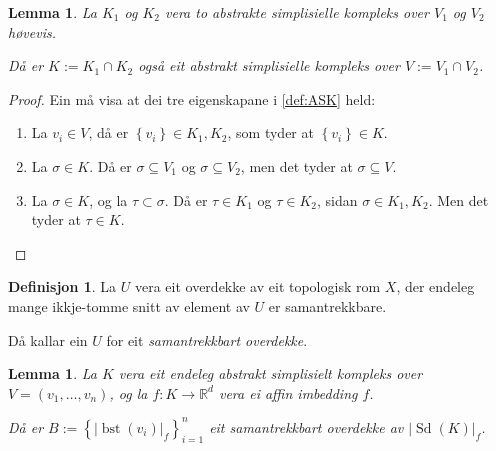 \documentclass[a4paper, 12pt, norsk]{article}
\theoremstyle{plain}
\newtheorem{lemma}[theorem]{Lemma}
\theoremstyle{definition}
\newtheorem{definition}[theorem]{Definisjon}
\newcommand{\Rb}{\mathbb{R}}
\newcommand{\intersect}{ \mathop{\cap}\limits }
\newcommand{\gr}[1]{ \lvert #1 \rvert } %
\newcommand{\set}[1]{ \left\{ #1 \right\} } %
\DeclareMathOperator{\Sd}{Sd} %
\DeclareMathOperator{\bst}{bst} %
\begin{document}
\begin{lemma} \label{thm:snitt-av-ASK-er-ASK}
	La \( K_1 \) og \( K_2 \) vera to abstrakte simplisielle kompleks over \( V_1 \) og \( V_2 \) høvevis. 
	
	Då er \( K := K_1 \intersect K_2 \) også eit abstrakt simplisielle kompleks over \( V := V_1 \intersect V_2 \).
\end{lemma}

\begin{proof}
	Ein må visa at dei tre eigenskapane i \autoref{def:ASK} held:
	\begin{enumerate}
		\item La \( v_i \in V \), då er \( \set{v_i} \in K_1, K_2 \), som tyder at \( \set{v_i} \in K \).
  		\item La \( \sigma \in K \). Då er \( \sigma \subseteq V_1 \) og \( \sigma \subseteq V_2 \), men det tyder at \( \sigma \subseteq V \).
    	\item La \( \sigma \in K \), og la \( \tau \subset \sigma \). Då er \( \tau \in K_1 \) og \( \tau \in K_2 \), sidan \( \sigma \in K_1, K_2 \). Men det tyder at \( \tau \in K \).
	\end{enumerate}
\end{proof}

\begin{definition}
	La \( U \) vera eit overdekke av eit topologisk rom \( X \), der endeleg mange ikkje-tomme snitt av element av \( U \) er samantrekkbare. 
	
	Då kallar ein \( U \) for eit \emph{samantrekkbart overdekke}.
\end{definition}

\begin{lemma} \label{thm:bst-good}
	La \( K \) vera eit endeleg abstrakt simplisielt kompleks over \( V = (v_1, \dots, v_n) \), og la \( f: K \to \Rb^d \) vera ei affin imbedding \( f \). 
	
	Då er \( B := \set{\gr{\bst(v_i)}_f}_{i=1}^{n} \) eit samantrekkbart overdekke av \( \gr{\Sd(K)}_f \).
\end{lemma}
\end{document}
